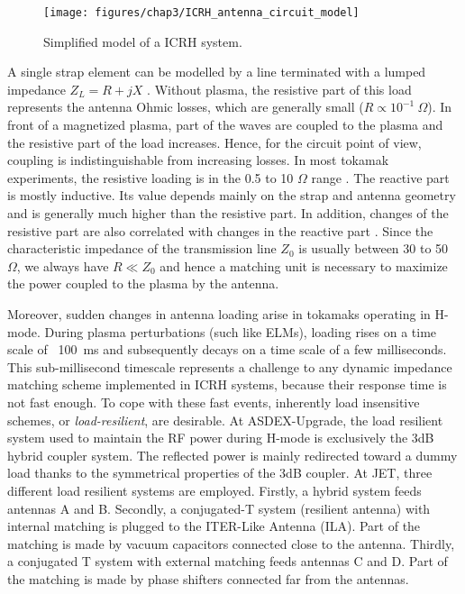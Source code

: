 \begin{figure}[h]
	\centering
	\texttt{[image: figures/chap3/ICRH\_antenna\_circuit\_model]}
	\caption{Simplified model of a ICRH system.}
	\label{fig:icrhantennacircuitmodel}
\end{figure}

A single strap element can be modelled by a line terminated with a lumped impedance $Z_L = R + j X$ . Without plasma, the resistive part of this load represents the antenna Ohmic losses, which are generally small ($R \propto 10^{-1}~\si{\Omega}$). In front of a magnetized plasma, part of the waves are coupled to the plasma and the resistive part of the load increases. Hence, for the circuit point of view, coupling is indistinguishable from increasing losses. In most tokamak experiments, the resistive loading is in the 0.5 to 10 $\si{\Omega}$ range . The reactive part is mostly inductive. Its value depends mainly on the strap and antenna geometry and is generally much higher than the resistive part. In addition, changes of the resistive part are also correlated with changes in the reactive part \cite{pinsker1998}. Since the characteristic impedance of the transmission line $Z_0$ is usually between 30 to 50~$\si{\Omega}$, we always have $R \ll Z_0$ and hence a matching unit is necessary to maximize the power coupled to the plasma by the antenna.

Moreover, sudden changes in antenna loading arise in tokamaks operating in H-mode. During plasma perturbations (such like ELMs), loading rises on a time scale of ~100~ms and subsequently decays on a time scale of a few milliseconds. This sub-millisecond timescale represents a challenge to any dynamic impedance matching scheme implemented in ICRH systems, because their response time is not fast enough. To cope with these fast events, inherently load insensitive schemes, or \textit{load-resilient}, are desirable. At ASDEX-Upgrade, the load resilient system used to maintain the RF power during H-mode is exclusively the 3dB hybrid coupler system. The reflected power is mainly redirected toward a dummy load thanks to the symmetrical properties of the 3dB coupler. At JET, three different load resilient systems are employed. Firstly, a hybrid system feeds antennas A and B. Secondly, a conjugated-T system (resilient antenna) with internal matching is plugged to the ITER-Like Antenna (ILA). Part of the matching is made by vacuum capacitors connected close to the antenna. Thirdly, a conjugated T system with external matching feeds antennas C and D. Part of the matching is made by phase shifters connected far from the antennas.


